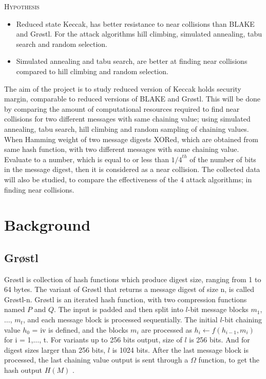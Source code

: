 \documentclass[12pt]{artikel3}                  %
\begin{document}
\vspace{3mm}
\begin{center}
  \framebox
  {
    \parbox{400pt}
    {
      \centering \textsc{Hypothesis} \\
      \begin{itemize}
      \item Reduced state Keccak, has better resistance to near collisions than BLAKE and Gr{\o}stl. For the
      attack algorithms hill climbing, simulated annealing, tabu search and random selection.
      \item Simulated annealing and tabu search, are better at finding near collisions compared to hill 
      climbing and random selection.
      \end{itemize}
    }
  }
\end{center}
\vspace{3mm}

The aim of the project is to study reduced version of Keccak holds security margin, comparable to reduced
versions of BLAKE and Gr{\o}stl. This will be done by comparing the amount of computational resources required
to find near collisions for two different messages with same chaining value; using simulated annealing, tabu
search, hill climbing and random sampling of chaining values. When Hamming weight of two message digests XORed, 
which are obtained from same hash function, with two different messages with same chaining value. Evaluate to 
a number, which is equal to or less than ${1/4}^{th}$ of the number of bits in the message digest, then it is
considered as a near collision. The collected data will also be studied, to compare the effectiveness of
the 4 attack algorithms; in finding near collisions.
 
\clearpage

\section{Background}

\subsection{Gr{\o}stl}

Gr{\o}stl is collection of hash functions which produce digest size, ranging from 1 to 64 bytes. The variant of
Gr{\o}stl that returns a message digest of size n, is called Gr{\o}stl-n. Gr{\o}stl is an iterated hash function, 
with two compression functions named $P$ and $Q$. The input is padded and then split into $l$-bit message blocks
$m_{1}$,$\ldots$, $m_{t}$, and each message block is processed sequentially. The initial $l$-bit chaining value 
$h_{0}$ = iv is defined, and the blocks $m_{i}$ are processed as $ h_{i}\gets f(h_{i-1}, m_{i})$ for i = 1,$\ldots$,
t. For variants up to 256 bits output, size of $l$ is 256 bits. And for digest sizes larger than 256 bits, $l$ 
is 1024 bits. After the last message block is processed, the last chaining value output is sent through a 
$\Omega$ function, to get the hash output $H(M)$ \cite{00019}. 
\end{document}
